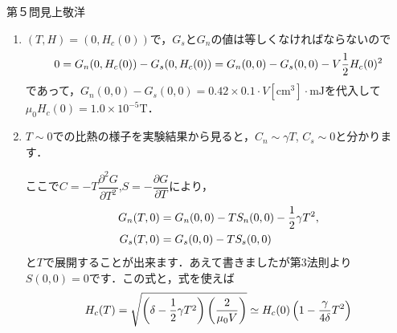 \begin{answer}{第５問}{見上敬洋}
\begin{enumerate}
  さて，path 2に沿って$H$を徐々に大きくしていくとき，$\displaystyle \pdif GH$の変化はどうなるかを考えると，
  \begin{equation}
  \pdif GH =
  \begin{cases}
  0 & H < H_c(T) \\
  -V\mu_0 H & H> H_c(T) \\
  \end{cases} \notag
  \end{equation}
  となって，臨界磁場付近で不連続．こうして1次相転移であることがわかります．

\item
  $(T,H) = (0,H_c(0))$で，$G_s$と$G_n$の値は等しくなければならないので
  \begin{equation}
  0= G_n(0,H_c(0))-G_s(0,H_c(0))= G_n(0,0) -G_s(0,0) - V\frac 12 H_c(0)^2 \notag
  \end{equation}
  であって，$G_n(0,0)-G_s(0,0) = 0.42\times 0.1 \cdot V[\mathrm{cm}^3] \cdot \mathrm{mJ}$を代入して$\mu_0H_c(0) = 1.0\times 10^{-5} \mathrm{T}$．

\item
  $T \sim 0$での比熱の様子を実験結果から見ると，$C_n \sim \gamma T$, $C_s \sim 0$と分かります．

  ここで$C = -T\dfrac{\partial^2 G}{\partial T^2}$,$S = -\dfrac{\partial G}{\partial T}$により，
  \begin{align}
  G_n(T,0) &= G_n(0,0) - TS_n(0,0) - \frac 12 \gamma T^2, \notag \\
  G_s(T,0) &= G_s(0,0) - TS_s(0,0)  \notag
  \end{align}
  と$T$で展開することが出来ます．あえて書きましたが第3法則より$S(0,0) =0$です．この式と，式を使えば
  \begin{equation}
  H_c(T) = \sqrt{\left(\delta - \dfrac 12 \gamma T^2\right)\left(\dfrac{2}{\mu_0V}\right)} \simeq H_c(0)\left(1 - \dfrac{\gamma}{4\delta} T^2 \right) \notag
  \end{equation}

\end{enumerate}
\end{answer}
